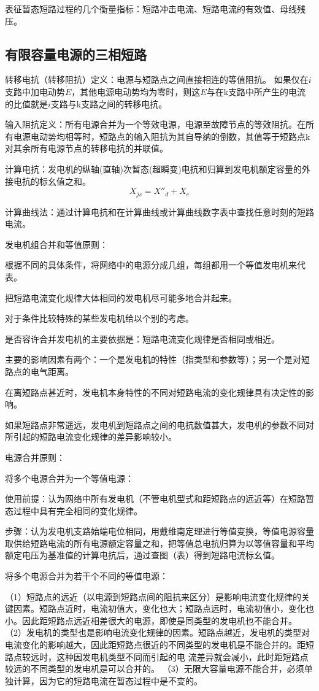 \documentclass[UTF8, 12pt, a4paper]{ctexart}
\begin{document}
表征暂态短路过程的几个衡量指标：短路冲击电流、短路电流的有效值、母线残压。
\subsection{有限容量电源的三相短路}
转移电抗（转移阻抗）定义：电源与短路点之间直接相连的等值阻抗。
如果仅在$i$支路中加电动势$\dot{E}$，其他电源电动势均为零时，则这$\dot{E}$与在k支路中所产生的电流的比值就是$i$支路与k支路之间的转移电抗。

输入阻抗定义：所有电源合并为一个等效电源，电源至故障节点的等效阻抗。在所有电源电动势均相等时，短路点的输入阻抗为其自导纳的倒数，其值等于短路点k对其余所有电源节点的转移电抗的并联值。

计算电抗：发电机的纵轴(直轴)次暂态(超瞬变)电抗和归算到发电机额定容量的外接电抗的标幺值之和。
\[X_{js}=X''_d+X_e\]

计算曲线法：通过计算电抗和在计算曲线或计算曲线数字表中查找任意时刻的短路电流。

发电机组合并和等值原则：%

根据不同的具体条件，将网络中的电源分成几组，每组都用一个等值发电机来代表。

把短路电流变化规律大体相同的发电机尽可能多地合并起来。

对于条件比较特殊的某些发电机给以个别的考虑。

是否容许合并发电机的主要依据是：短路电流变化规律是否相同或相近。

主要的影响因素有两个：一个是发电机的特性（指类型和参数等）；另一个是对短路点的电气距离。

在离短路点甚近时，发电机本身特性的不同对短路电流的变化规律具有决定性的影响。

如果短路点非常遥远，发电机到短路点之间的电抗数值甚大，发电机的参数不同对所引起的短路电流变化规律的差异影响较小。

电源合并原则：

将多个电源合并为一个等值电源：

使用前提：认为网络中所有发电机（不管电机型式和距短路点的远近等）在短路暂态过程中具有完全相同的变化规律。

步骤：认为发电机支路始端电位相同，用戴维南定理进行等值变换，等值电源容量取供给短路电流的所有电源额定容量之和，把等值总电抗归算为以等值容量和平均额定电压为基准值的计算电抗后，通过查图（表）得到短路电流标幺值。

将多个电源合并为若干个不同的等值电源：

（1）短路点的远近（以电源到短路点间的阻抗来区分）是影响电流变化规律的关键因素。短路点近时，电流初值大，变化也大；短路点远时，电流初值小，变化也小。因此距短路点远近相差很大的电源，即使是同类型的发电机也不能合并。
（2）发电机的类型也是影响电流变化规律的因素。短路点越近，发电机的类型对电流变化的影响越大，因此距短路点很近的不同类型的发电机是不能合并的。距短路点较远时，这种因发电机类型不同而引起的电 流差异就会减小，此时距短路点较远的不同类型的发电机是可以合并的。
（3）无限大容量电源不能合并，必须单独计算，因为它的短路电流在暂态过程中是不变的。
\newpage
\end{document}
